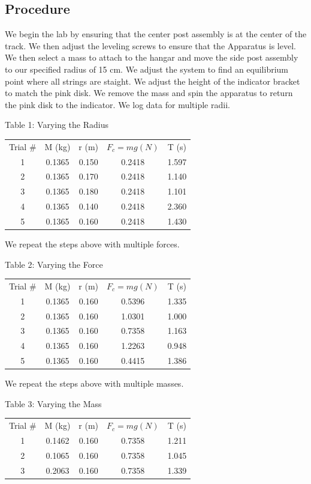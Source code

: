 \documentclass[12pt]{report}
\begin{document}
\begin{flushleft}
\begin{multicols}{2}
\section{Procedure}
We begin the lab by ensuring that the center post assembly is at the center of the track.
We then adjust the leveling screws to ensure that the Apparatus is level. We then select a mass to attach to the hangar and move the side post assembly to our specified radius of 15 cm. We adjust the system to find an equilibrium point where all strings are staight. We adjust the height of the indicator bracket to match the pink disk. We remove the mass and spin the apparatus to return the pink disk to the indicator. We log data for multiple radii.
\begin{center}
\flushleft Table 1: Varying the Radius
\footnotesize
\begin{tabular}{|c|c|c|c|c|}
\hline
Trial \# & M (kg) & r (m) & $F_c = mg (N)$ & T (s) \\
1 & 0.1365 & 0.150 & 0.2418 & 1.597 \\
2 & 0.1365 & 0.170 & 0.2418 & 1.140 \\
3 & 0.1365 & 0.180 & 0.2418 & 1.101 \\
4 & 0.1365 & 0.140 & 0.2418 & 2.360 \\
5 & 0.1365 & 0.160 & 0.2418 & 1.430 \\
\hline
\end{tabular}
\end{center}
\vspace{0.5cm}
We repeat the steps above with multiple forces.
\begin{center}
\flushleft Table 2: Varying the Force
\footnotesize
\begin{tabular}{|c|c|c|c|c|}
\hline
Trial \# & M (kg) & r (m) & $F_c = mg (N)$ & T (s) \\
1 & 0.1365 & 0.160 & 0.5396 & 1.335 \\
2 & 0.1365 & 0.160 & 1.0301 & 1.000 \\
3 & 0.1365 & 0.160 & 0.7358 & 1.163 \\
4 & 0.1365 & 0.160 & 1.2263 & 0.948 \\
5 & 0.1365 & 0.160 & 0.4415 & 1.386 \\
\hline
\end{tabular}
\end{center}
\vspace{0.5cm}
We repeat the steps above with multiple masses.
\begin{center}
\flushleft Table 3: Varying the Mass
\footnotesize
\begin{tabular}{|c|c|c|c|c|}
\hline
Trial \# & M (kg) & r (m) & $F_c = mg (N)$ & T (s) \\
1 & 0.1462 & 0.160 & 0.7358 & 1.211 \\
2 & 0.1065 & 0.160 & 0.7358 & 1.045 \\
3 & 0.2063 & 0.160 & 0.7358 & 1.339 \\
\hline
\end{tabular}
\end{center}


\end{multicols}
\end{flushleft}
\end{document}
